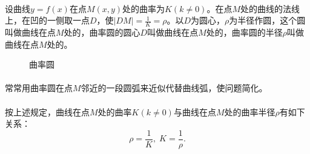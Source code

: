 \paragraph{}
设曲线$y=f(x)$在点$M(x,y)$处的曲率为$K(k\neq0)$。在点$M$处的曲线的法线上，在凹的一侧取一点$D$，使$\displaystyle|DM|=\frac{1}{K}=\rho$。以$D$为圆心，$\rho$为半径作圆，这个圆叫做曲线在点$M$处的，曲率圆的圆心$D$叫做曲线在点$M$处的，曲率圆的半径$\rho$叫做曲线在点$M$处的。

\begin{figure}[H]
\centering
  
  \caption{曲率圆}
  \label{曲率圆}
\end{figure}

\paragraph{}
常常用曲率圆在点$M$邻近的一段圆弧来近似代替曲线弧，使问题简化。

\paragraph{}
按上述规定，曲线在点$M$处的曲率$K(k\neq0)$与曲线在点$M$处的曲率半径$\rho$有如下关系：
\begin{equation}
  \rho=\frac{1}{K}, \; K = \frac{1}{\rho}.
\end{equation}
